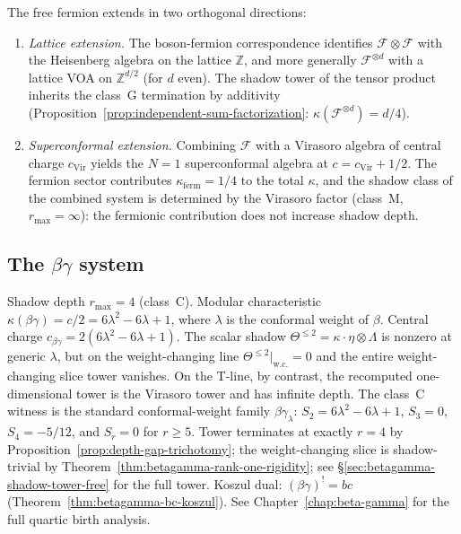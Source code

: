 \begin{remark}
\label{rem:fermion-extensions}
The free fermion extends in two orthogonal directions:
\begin{enumerate}
\item \emph{Lattice extension.}
 The boson-fermion correspondence identifies
 $\mathcal{F} \otimes \mathcal{F}$ with the
 Heisenberg algebra on the lattice $\mathbb{Z}$, and more
 generally $\mathcal{F}^{\otimes d}$ with a lattice VOA on
 $\mathbb{Z}^{d/2}$ \textup{(}for $d$ even\textup{)}. The shadow
 tower of the tensor product inherits the class~G termination by
 additivity \textup{(}Proposition~\ref{prop:independent-sum-factorization}:
 $\kappa(\mathcal{F}^{\otimes d}) = d/4$\textup{)}.

\item \emph{Superconformal extension.}
 Combining $\mathcal{F}$ with a Virasoro algebra of central
 charge $c_{\mathrm{Vir}}$ yields the $N = 1$ superconformal algebra
 at $c = c_{\mathrm{Vir}} + 1/2$. The fermion sector contributes
 $\kappa_{\mathrm{ferm}} = 1/4$ to the total $\kappa$, and the
 shadow class of the combined system is determined by the Virasoro
 factor \textup{(}class~M, $r_{\max} = \infty$\textup{)}: the
 fermionic contribution does not increase shadow depth.
\end{enumerate}
\end{remark}

\subsection{\texorpdfstring{The $\beta\gamma$ system}{The beta-gamma system}}

\begin{remark}
\label{rem:betagamma-shadow-archetype-free}
Shadow depth $r_{\max} = 4$ (class~C).
Modular characteristic $\kappa(\beta\gamma) = c/2 = 6\lambda^2 - 6\lambda + 1$,
where $\lambda$ is the conformal weight of $\beta$.
Central charge $c_{\beta\gamma} = 2(6\lambda^2 - 6\lambda + 1)$.
The scalar shadow $\Theta^{\leq 2} = \kappa \cdot \eta \otimes \Lambda$
is nonzero at generic $\lambda$, but on the weight-changing line
$\Theta^{\leq 2}\big|_{\mathrm{w.c.}} = 0$ and the entire
weight-changing slice tower vanishes. On the T-line, by contrast, the
recomputed one-dimensional tower is the Virasoro tower and has infinite
depth. The class~C witness is the standard conformal-weight family
$\beta\gamma_\lambda$:
$S_2 = 6\lambda^2 - 6\lambda + 1$, $S_3 = 0$,
$S_4 = -5/12$, and $S_r = 0$ for $r \geq 5$.
Tower terminates at exactly $r = 4$ by
Proposition~\ref{prop:depth-gap-trichotomy}; the
weight-changing slice is shadow-trivial by
Theorem~\ref{thm:betagamma-rank-one-rigidity};
see \S\ref{sec:betagamma-shadow-tower-free} for the full tower.
Koszul dual: $(\beta\gamma)^! = bc$
(Theorem~\ref{thm:betagamma-bc-koszul}).
See Chapter~\ref{chap:beta-gamma} for the full quartic
birth analysis.
\end{remark}

